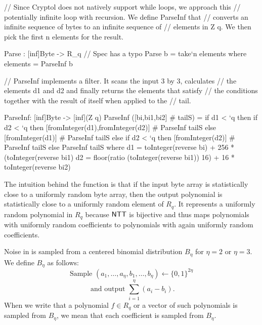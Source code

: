 \begin{code}
  // Since Cryptol does not natively support while loops, we approach this
  // potentially infinite loop with recursion. We define ParseInf that 
  // converts an infinite sequence of bytes to an infinite sequence of
  // elements in Z q. We then pick the first n elements for the result.

  Parse : [inf]Byte -> R_q // Spec has a typo
  Parse b = take`{n} elements
      where elements = ParseInf b

  // ParseInf implements a filter. It scans the input 3 by 3, calculates
  // the elements d1 and d2 and finally returns the elements that satisfy 
  // the conditions together with the result of itself when applied to the
  // tail.

  ParseInf: [inf]Byte -> [inf](Z q)
  ParseInf ([bi,bi1,bi2] # tailS) =
      if d1 < `q then
          if d2 < `q then
              [fromInteger(d1),fromInteger(d2)] # ParseInf tailS
          else
              [fromInteger(d1)] # ParseInf tailS
      else
          if d2 < `q then
              [fromInteger(d2)] # ParseInf tailS
          else
              ParseInf tailS
      where
          d1 = toInteger(reverse bi) + 256 * (toInteger(reverse bi1) %
          d2 = floor(ratio (toInteger(reverse bi1)) 16) + 16 * toInteger(reverse bi2)
\end{code}

The intuition behind the function \Parse is that if the input byte array
is statistically close to a uniformly random byte array, then the output
polynomial is statistically close to a uniformly random element of $R_q$. 
It represents a uniformly random polynomial in $R_q$ because $\mbox{\textsf{NTT}}$ is bijective and thus maps polynomials with uniformly random coefficients to polynomials with again uniformly random coefficients. 


Noise in \Kyber is sampled from a centered binomial distribution $B_{\eta}$
for $\eta=2$ or $\eta=3$. We define $B_\eta$ as follows:
\[
\text{Sample } (a_1,\ldots,a_\eta,b_1,\ldots,b_\eta)\gets \{0,1\}^{2\eta}\]
\[\text{ and output }\sum_{i=1}^\eta (a_i-b_i).\]
When we write that a polynomial $f \in R_q$ or a vector of such polynomials
is sampled from $B_\eta$, we mean that each coefficient is sampled from $B_\eta$.

